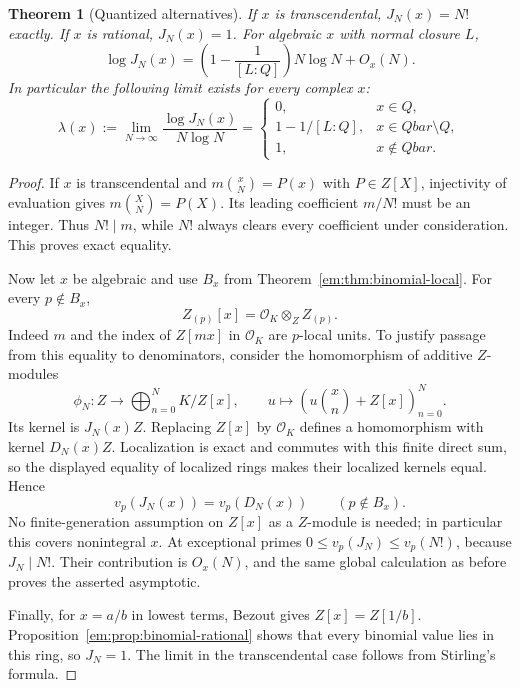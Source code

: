 \documentclass[11pt,a4paper]{article}
\newcommand{\Q}{\mathbb Q}
\newcommand{\Z}{\mathbb Z}
\newcommand{\QB}{\overline{\mathbb Q}}
\newcommand{\Qbar}{\overline{\mathbb Q}}
\newtheorem{theorem}{Theorem}[section]
\theoremstyle{definition}
\theoremstyle{remark}
\theoremstyle{plain}
\numberwithin{equation}{section}
\def\Qbar{Qbar}\def\QB{Qbar}\def\mathbb#1{#1}%
\begin{document}
\begin{theorem}[Quantized alternatives]
\label{em:thm:binomial-universal}
If $x$ is transcendental, $J_N(x)=N!$ exactly.  If $x$ is rational,
$J_N(x)=1$.  For algebraic $x$ with normal closure $L$,
\[
 \log J_N(x)=\left(1-\frac1{[L:\Q]}\right)N\log N+O_x(N).
\]
In particular the following limit exists for every complex $x$:
\[
 \lambda(x):=\lim_{N\to\infty}\frac{\log J_N(x)}{N\log N}
 =\begin{cases}
 0,&x\in\Q,\\
 1-1/[L:\Q],&x\in\Qbar\setminus\Q,\\
 1,&x\notin\Qbar.
 \end{cases}
\]
\end{theorem}
\begin{proof}
If $x$ is transcendental and $m\binom{x}{N}=P(x)$ with
$P\in\Z[X]$, injectivity of evaluation gives
$m\binom{X}{N}=P(X)$.  Its leading coefficient $m/N!$ must be an
integer.  Thus $N!\mid m$, while $N!$ always clears every coefficient
under consideration.  This proves exact equality.

Now let $x$ be algebraic and use $B_x$ from
Theorem~\ref{em:thm:binomial-local}.  For every $p\notin B_x$,
\[
 \Z_{(p)}[x]=\mathcal O_K\otimes_\Z\Z_{(p)}.
\]
Indeed $m$ and the index of $\Z[mx]$ in $\mathcal O_K$ are
$p$-local units.  To justify passage from this equality to denominators,
consider the homomorphism of additive $\Z$-modules
\[
 \phi_N:\Z\longrightarrow
       \bigoplus_{n=0}^N K/\Z[x],\qquad
 u\longmapsto\left(u\binom{x}{n}+\Z[x]\right)_{n=0}^N.
\]
Its kernel is $J_N(x)\Z$.  Replacing $\Z[x]$ by $\mathcal O_K$
defines a homomorphism with kernel $D_N(x)\Z$.  Localization is exact
and commutes with this finite direct sum, so the displayed equality
of localized rings makes their localized kernels equal.  Hence
\[
 v_p(J_N(x))=v_p(D_N(x))\qquad(p\notin B_x).
\]
No finite-generation assumption on $\Z[x]$ as a $\Z$-module is
needed; in particular this covers nonintegral $x$.  At exceptional
primes $0\le v_p(J_N)\le v_p(N!)$, because $J_N\mid N!$.
Their contribution is $O_x(N)$, and the same global calculation
as before proves the asserted asymptotic.

Finally, for $x=a/b$ in lowest terms, Bezout gives
$\Z[x]=\Z[1/b]$.  Proposition~\ref{em:prop:binomial-rational} shows
that every binomial value lies in this ring, so $J_N=1$.  The limit
in the transcendental case follows from Stirling's formula.
\end{proof}
\end{document}
